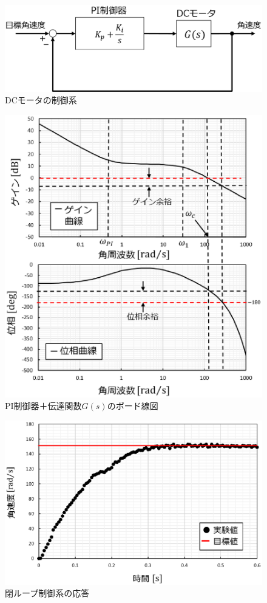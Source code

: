 \begin{figure}[htb]
  \centering
    \includegraphics[width=0.7\hsize]{picture/eps/pi_control.eps}
  \caption{DCモータの制御系}
  \label{fig::pi_control}
  
\end{figure}

\begin{figure}[htb]
  \centering
    \includegraphics[width=0.7\hsize]{picture/eps/pi_board.eps}
  \caption{PI制御器＋伝達関数$G(s)$のボード線図}
  \label{fig::pi_board}
  
\end{figure}

\begin{figure}[htb]
  \centering
    \includegraphics[width=0.7\hsize]{picture/eps/pi_response.eps}
  \caption{閉ループ制御系の応答}
  \label{fig::pi_response}
  
\end{figure}
